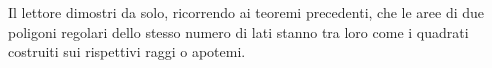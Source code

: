 Il lettore dimostri da solo, ricorrendo ai teoremi precedenti, che le aree di due poligoni regolari dello stesso numero di lati stanno tra loro come i quadrati costruiti sui rispettivi raggi o apotemi.

\begin{comment}

►7.  Proprietà di secanti e tangenti ad una circonferenza
Osserviamo che in una circonferenza, due corde possono intersecarsi internamente al cerchio o esternamente.
TEOREMA DELLE CORDE. Se due corde di una circonferenza si incontrano in un punto interno al cerchio allora le due corde restano divise in modo che le parti di una siano i medi e le parti dell'altra gli estremi della stessa proporzione.
Ipotesi
AB e CD sono due corde che si intersecano in E.
Tesi
EB:ED=EC:EA
Dimostrazione
Dovendo arrivare ad una proporzione tra segmenti, cercheremo di individuare la similitudine tra due triangoli; a questo scopo congiungiamo B con C e A con D e consideriamo i triangoli …... ed …… Essi hanno: perché opposti al vertice;  perché insistono … … … Dunque risultano simili per il primo criterio di similitudine. Quindi individuati i lati omologhi possiamo scrivere la proporzione BC:DA=EB:ED=EC:EA ▄

TEOREMA DELLE SECANTI. Se da un punto esterno a un cerchio si conducono due secanti alla circonferenza, allora un'intera secante e la sua parte esterna formano i medi e l'altra secante e la sua parte esterna sono gli estremi di una stessa proporzione.
Ipotesi
AB e CD sono due corde che si intersecano in E esterno alla circonferenza.
Tesi
EC:ED=EA:EB
Dimostrazione
Dovendo determinare una proporzione tra segmenti, cercheremo di individuare la similitudine tra due triangoli; a questo scopo congiungiamo B con C e A con D. I triangoli EBC ed EAD sono simili perché hanno:  in comune, perché insistono sullo stesso arco DB. Risultano quindi simili per il primo criterio di similitudine. Possiamo allora scrivere la proporzione tra i lati EC:ED=EA:EB ▄

TEOREMA DELLA SECANTE E DELLA TANGENTE. Se da un punto esterno a un cerchio si conduce una secante e una tangente alla circonferenza, allora il segmento di tangente è medio proporzionale tra l’intera secante e la sua parte esterna alla circonferenza.
Ipotesi : B punto esterno alla circonferenza, BA tangente in A, BE secante in D e E.
Tesi : BE:BA=BA:BD
Dimostrazione: 
Dovendo determinare una proporzione tra segmenti, cercheremo di individuare la similitudine tra due triangoli; a questo scopo congiungiamo A con E e A con D e consideriamo i triangoli EBA e DBA. Essi hanno perché coincidenti; perché angoli alla circonferenza che insistono sullo stesso arco AC. I due triangoli sono simili per il primo criterio di similitudine. Individuati i lati omologhi si può scrivere la proporzione BE: BA=BA:BD ▄


\end{comment}
